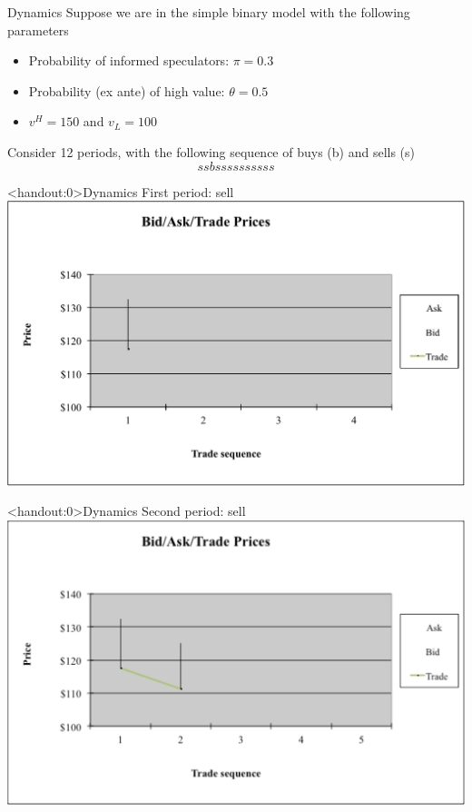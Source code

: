 \documentclass[english,10pt
,aspectratio=169
]{beamer}
\begin{document}
\begin{frame}[label=dynamics]{Dynamics}
	Suppose we are in the simple binary model with the following parameters
	\begin{itemize}
		\item Probability of informed speculators: $\pi = 0.3$
		\item Probability (ex ante) of high value: $\theta = 0.5$
		\item $v^H=150$ and $v_L=100$
	\end{itemize}
	Consider 12 periods, with the following sequence of buys (b) and sells (s)
	\[
	ssbssssssssss
	\]
\end{frame}


\begin{frame}<handout:0>{Dynamics}
	First period: sell
	\center
	\includegraphics[width=0.9\linewidth]{pics/P1_Image.pdf}
\end{frame}


\begin{frame}<handout:0>{Dynamics}
	Second period: sell
	\center
	\includegraphics[width=0.9\linewidth]{pics/P2_Image.pdf}
\end{frame}
\end{document}
